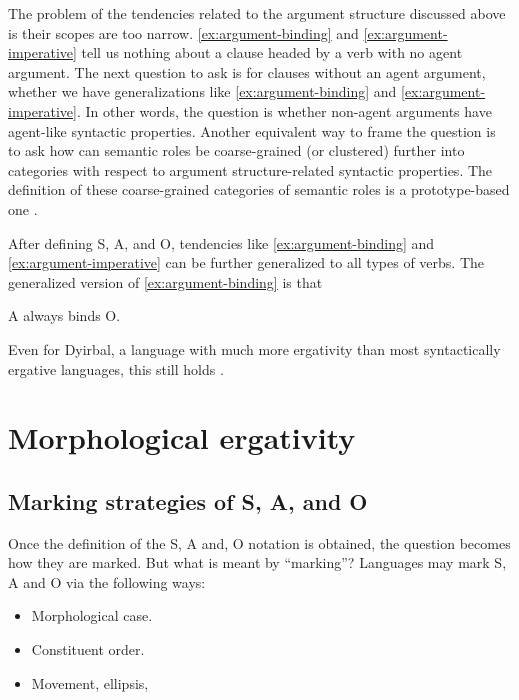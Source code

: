 \documentclass{article}
\newcommand*{\citesec}[1]{\S~{#1}}
\begin{document}
The problem of the tendencies related to the argument structure discussed above 
is their scopes are too narrow.
\eqref{ex:argument-binding} and \eqref{ex:argument-imperative} tell us nothing about 
a clause headed by a verb with no agent argument.
The next question to ask is for clauses without an agent argument,
whether we have generalizations like \eqref{ex:argument-binding} and \eqref{ex:argument-imperative}.
In other words, the question is whether non-agent arguments have agent-like syntactic properties.
Another equivalent way to frame the question is to ask 
how can semantic roles be coarse-grained (or clustered) further into categories 
with respect to argument structure-related syntactic properties.
The definition of these coarse-grained categories of semantic roles is a prototype-based one
\citep[\citesec{5.2}]{comrie1989language}.

After defining S, A, and O, tendencies like \eqref{ex:argument-binding} and \eqref{ex:argument-imperative}
can be further generalized to all types of verbs.
The generalized version of \eqref{ex:argument-binding} is that 
\begin{exe} 
    \ex A always binds O.
\end{exe}   
Even for Dyirbal, a language with much more ergativity than most syntactically ergative languages, 
this still holds \citep{van2003syntactic}.

\section{Morphological ergativity}\label{sec:morphologcal-ergativity}

\subsection{Marking strategies of S, A, and O}

Once the definition of the S, A and, O notation is obtained, 
the question becomes how they are marked.
But what is meant by ``marking''?
Languages may mark S, A and O via the following ways:
\begin{itemize} %
    \item Morphological case.
    \item Constituent order.
    \item Movement, ellipsis, 
\end{itemize}


\end{document}

